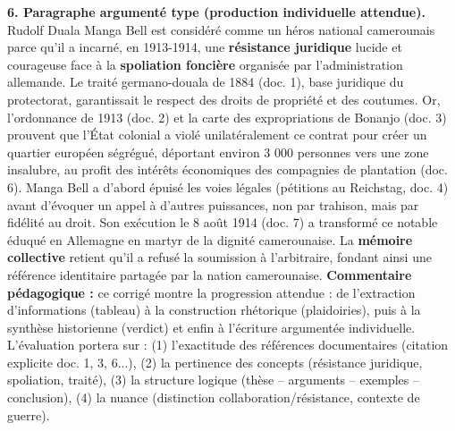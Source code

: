 \documentclass[11pt]{article}
\newcommand{\cle}[1]{{\popxbold\color{popdark}#1}}
\begin{document}
\begin{exoresolu}
\textbf{6. Paragraphe argumenté type (production individuelle attendue).}
\og Rudolf Duala Manga Bell est considéré comme un héros national camerounais parce qu'il a incarné, en 1913-1914, une \textbf{résistance juridique} lucide et courageuse face à la \textbf{spoliation foncière} organisée par l'administration allemande. Le traité germano-douala de 1884 (doc. 1), base juridique du protectorat, garantissait le respect des droits de propriété et des coutumes. Or, l'ordonnance de 1913 (doc. 2) et la carte des expropriations de Bonanjo (doc. 3) prouvent que l'État colonial a violé unilatéralement ce contrat pour créer un quartier européen ségrégué, déportant environ 3 000 personnes vers une zone insalubre, au profit des intérêts économiques des compagnies de plantation (doc. 6). Manga Bell a d'abord épuisé les voies légales (pétitions au Reichstag, doc. 4) avant d'évoquer un appel à d'autres puissances, non par trahison, mais par fidélité au droit. Son exécution le 8 août 1914 (doc. 7) a transformé ce notable éduqué en Allemagne en martyr de la dignité camerounaise. La \textbf{mémoire collective} retient qu'il a refusé la soumission à l'arbitraire, fondant ainsi une référence identitaire partagée par la nation camerounaise. \fg
\tcblower
\textbf{Commentaire pédagogique :} ce corrigé montre la progression attendue : de l'extraction d'informations (tableau) à la construction rhétorique (plaidoiries), puis à la synthèse historienne (verdict) et enfin à l'écriture argumentée individuelle. L'évaluation portera sur : (1) l'exactitude des références documentaires (citation explicite doc. 1, 3, 6...), (2) la pertinence des concepts (\cle{résistance juridique}, \cle{spoliation}, \cle{traité}), (3) la structure logique (thèse -- arguments -- exemples -- conclusion), (4) la nuance (distinction collaboration/résistance, contexte de guerre).
\end{exoresolu}
\end{document}
